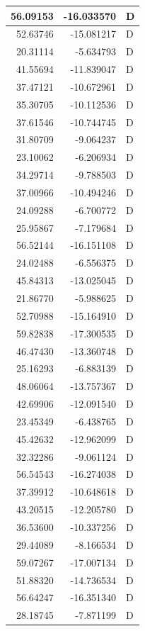 \documentclass[
  letterpaper,
  DIV=11,
  numbers=noendperiod]{scrartcl}
\begin{document}
\begin{table}
\begin{tabular}[t]{r|r|l}
\hline
56.09153 & -16.033570 & D\\
\hline
52.63746 & -15.081217 & D\\
\hline
20.31114 & -5.634793 & D\\
\hline
41.55694 & -11.839047 & D\\
\hline
37.47121 & -10.672961 & D\\
\hline
35.30705 & -10.112536 & D\\
\hline
37.61546 & -10.744745 & D\\
\hline
31.80709 & -9.064237 & D\\
\hline
23.10062 & -6.206934 & D\\
\hline
34.29714 & -9.788503 & D\\
\hline
37.00966 & -10.494246 & D\\
\hline
24.09288 & -6.700772 & D\\
\hline
25.95867 & -7.179684 & D\\
\hline
56.52144 & -16.151108 & D\\
\hline
24.02488 & -6.556375 & D\\
\hline
45.84313 & -13.025045 & D\\
\hline
21.86770 & -5.988625 & D\\
\hline
52.70988 & -15.164910 & D\\
\hline
59.82838 & -17.300535 & D\\
\hline
46.47430 & -13.360748 & D\\
\hline
25.16293 & -6.883139 & D\\
\hline
48.06064 & -13.757367 & D\\
\hline
42.69906 & -12.091540 & D\\
\hline
23.45349 & -6.438765 & D\\
\hline
45.42632 & -12.962099 & D\\
\hline
32.32286 & -9.061124 & D\\
\hline
56.54543 & -16.274038 & D\\
\hline
37.39912 & -10.648618 & D\\
\hline
43.20515 & -12.205780 & D\\
\hline
36.53600 & -10.337256 & D\\
\hline
29.44089 & -8.166534 & D\\
\hline
59.07267 & -17.007134 & D\\
\hline
51.88320 & -14.736534 & D\\
\hline
56.64247 & -16.351340 & D\\
\hline
28.18745 & -7.871199 & D\\

\end{tabular}
\end{table}
\end{document}
